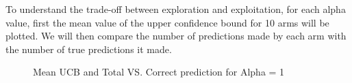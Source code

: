 To understand the trade-off between exploration and exploitation, for each alpha value, first the mean value of the upper confidence bound for 10 arms will be plotted. We will then compare the number of predictions made by each arm with the number of true predictions it made.
\begin{frame}{}
\begin{figure}[htbp]
\centering
{}%
%
\centering
\caption{ Mean UCB and Total VS. Correct prediction for
Alpha = 1}
\end{figure}  
\end{frame}

